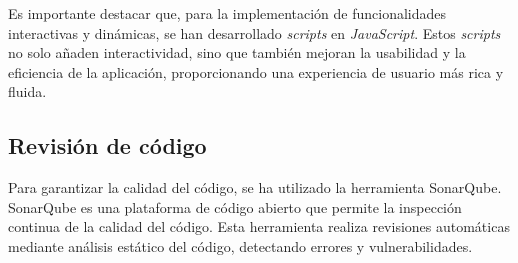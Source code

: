 Es importante destacar que, para la implementación de funcionalidades interactivas y dinámicas, se han desarrollado \textit{scripts} en \textit{JavaScript}. Estos \textit{scripts} no solo añaden interactividad, sino que también mejoran la usabilidad y la eficiencia de la aplicación, proporcionando una experiencia de usuario más rica y fluida.


\subsection{Revisión de código}
Para garantizar la calidad del código, se ha utilizado la herramienta SonarQube. SonarQube es una plataforma de código abierto que permite la inspección continua de la calidad del código. Esta herramienta realiza revisiones automáticas mediante análisis estático del código, detectando errores y vulnerabilidades.
